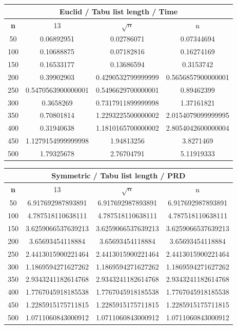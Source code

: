 \documentclass{article}
\begin{document}
\begin{center}
\begin{tabular}{|c|c|c|c|}
\hline
\multicolumn{4}{|c|}{\textbf{Euclid / Tabu list length / Time}}\\
\hline
\textbf{n} & 13 & $\sqrt{n}$ & n\\
\hline
50 & 0.06892951 & 0.02786071 & 0.07344694\\
\hline
100 & 0.10688875 & 0.07182816 & 0.16274169\\
\hline
150 & 0.16533177 & 0.13686594 & 0.3153742\\
\hline
200 & 0.39902903 & 0.4290532799999999 & 0.5656857900000001\\
\hline
250 & 0.5470563900000001 & 0.5496629700000001 & 0.89462399\\
\hline
300 & 0.3658269 & 0.7317911899999998 & 1.37161821\\
\hline
350 & 0.70801814 & 1.2293225500000002 & 2.0154079099999995\\
\hline
400 & 0.31940638 & 1.1810165700000002 & 2.8054042600000004\\
\hline
450 & 1.1279154999999998 & 1.94813256 & 3.8271469\\
\hline
500 & 1.79325678 & 2.76704791 & 5.11919333\\
\hline
\end{tabular}
\end{center}


\begin{center}
\begin{tabular}{|c|c|c|c|}
\hline
\multicolumn{4}{|c|}{\textbf{Symmetric / Tabu list length / PRD}}\\
\hline
\textbf{n} & 13 & $\sqrt{n}$ & n\\
\hline
50 & 6.917692987893891 & 6.917692987893891 & 6.917692987893891\\
\hline
100 & 4.787518110638111 & 4.787518110638111 & 4.787518110638111\\
\hline
150 & 3.6259066537639213 & 3.6259066537639213 & 3.6259066537639213\\
\hline
200 & 3.65693454118884 & 3.65693454118884 & 3.65693454118884\\
\hline
250 & 2.4413015900221464 & 2.4413015900221464 & 2.4413015900221464\\
\hline
300 & 1.1869594271627262 & 1.1869594271627262 & 1.1869594271627262\\
\hline
350 & 2.9343241182614768 & 2.9343241182614768 & 2.9343241182614768\\
\hline
400 & 1.7767045918185538 & 1.7767045918185538 & 1.7767045918185538\\
\hline
450 & 1.2285915175711815 & 1.2285915175711815 & 1.2285915175711815\\
\hline
500 & 1.0711060843000912 & 1.0711060843000912 & 1.0711060843000912\\
\hline
\end{tabular}
\end{center}
\end{document}

